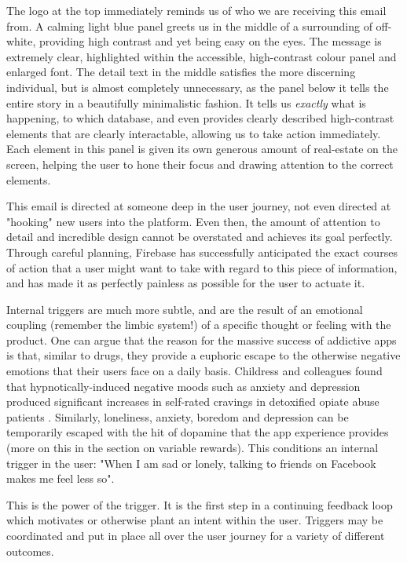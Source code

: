 The logo at the top immediately reminds us of who we are receiving this email from. A calming light blue panel greets us in the middle of a surrounding of off-white, providing high contrast and yet being easy on the eyes. The message is extremely clear, highlighted within the accessible, high-contrast colour panel and enlarged font.  The detail text in the middle satisfies the more discerning individual, but is almost completely unnecessary, as the panel below it tells the entire story in a beautifully minimalistic fashion. It tells us \textit{exactly} what is happening, to which database, and even provides clearly described high-contrast elements that are clearly interactable, allowing us to take action immediately. Each element in this panel is given its own generous amount of real-estate on the screen, helping the user to hone their focus and drawing attention to the correct elements.

This email is directed at someone deep in the user journey, not even directed at "hooking" new users into the platform. Even then, the amount of attention to detail and incredible design cannot be overstated and achieves its goal perfectly. Through careful planning, Firebase has successfully anticipated the exact courses of action that a user might want to take with regard to this piece of information, and has made it as perfectly painless as possible for the user to actuate it.

Internal triggers are much more subtle, and are the result of an emotional coupling (remember the limbic system!) of a specific thought or feeling with the product. One can argue that the reason for the massive success of addictive apps is that, similar to drugs, they provide a euphoric escape to the otherwise negative emotions that their users face on a daily basis. Childress and colleagues found that hypnotically-induced negative moods such as anxiety and depression produced significant increases in self-rated cravings in detoxified opiate abuse patients \cite{childress1994can}. Similarly, loneliness, anxiety, boredom and depression can be temporarily escaped with the hit of dopamine that the app experience provides (more on this in the section on variable rewards). This conditions an internal trigger in the user: "When I am sad or lonely, talking to friends on Facebook makes me feel less so".

This is the power of the trigger. It is the first step in a continuing feedback loop which motivates or otherwise plant an intent within the user. Triggers may be coordinated and put in place all over the user journey for a variety of different outcomes.

